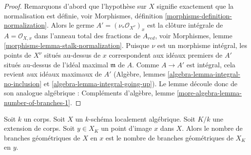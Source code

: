 \begin{proof}
Remarquons d'abord que l'hypothèse sur $X$ signifie exactement que la
normalisation est définie, voir
Morphismes, définition \ref{morphisms-definition-normalization}.
Alors le germe $A' = (\nu_*\mathcal{O}_{X^\nu})_x$ est la
clôture intégrale de $A = \mathcal{O}_{X, x}$ dans l'anneau total
des fractions de $A_{red}$, voir
Morphismes, lemme \ref{morphisms-lemma-stalk-normalization}.
Puisque $\nu$ est un morphisme intégral,
les points de $X^\nu$ situés au-dessus de $x$ correspondent
aux idéaux premiers de $A'$ situés au-dessus de l'idéal maximal $\mathfrak m$
de $A$. Comme $A \to A'$ est intégral, cela revient aux
idéaux maximaux de $A'$
(Algèbre, lemmes \ref{algebra-lemma-integral-no-inclusion} et
\ref{algebra-lemma-integral-going-up}).
Le lemme découle donc
de son analogue algébrique :
Compléments d'algèbre, lemme \ref{more-algebra-lemma-number-of-branches-1}.
\end{proof}

\begin{lemma}
\label{lemma-geometric-branches-and-change-of-fields}
Soit $k$ un corps. Soit $X$ un $k$-schéma localement algébrique.
Soit $K/k$ une extension de corps. Soit $y \in X_K$ un
point d'image $x$ dans $X$. Alors le nombre de
branches géométriques de $X$ en $x$ est le nombre de branches géométriques
de $X_K$ en $y$.
\end{lemma}

